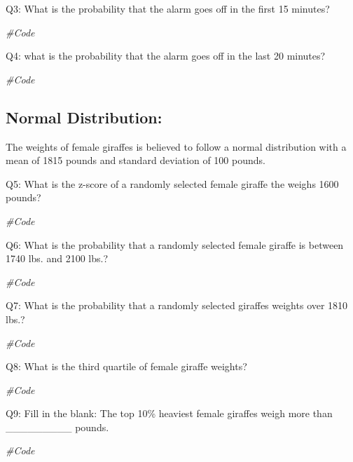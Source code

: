 \documentclass[]{article}
\newenvironment{Shaded}{\begin{snugshade}}{\end{snugshade}}
\newcommand{\CommentTok}[1]{\textcolor[rgb]{0.56,0.35,0.01}{\textit{#1}}}
\begin{document}
Q3: What is the probability that the alarm goes off in the first 15
minutes?

\begin{Shaded}
\begin{Highlighting}[]
\CommentTok{#Code}
\end{Highlighting}
\end{Shaded}

Q4: what is the probability that the alarm goes off in the last 20
minutes?

\begin{Shaded}
\begin{Highlighting}[]
\CommentTok{#Code}
\end{Highlighting}
\end{Shaded}

\newpage

\hypertarget{normal-distribution}{%
\subsection{Normal Distribution:}\label{normal-distribution}}

The weights of female giraffes is believed to follow a normal
distribution with a mean of 1815 pounds and standard deviation of 100
pounds.

Q5: What is the z-score of a randomly selected female giraffe the weighs
1600 pounds?

\begin{Shaded}
\begin{Highlighting}[]
\CommentTok{#Code}
\end{Highlighting}
\end{Shaded}

Q6: What is the probability that a randomly selected female giraffe is
between 1740 lbs. and 2100 lbs.?

\begin{Shaded}
\begin{Highlighting}[]
\CommentTok{#Code}
\end{Highlighting}
\end{Shaded}

Q7: What is the probability that a randomly selected giraffes weights
over 1810 lbs.?

\begin{Shaded}
\begin{Highlighting}[]
\CommentTok{#Code}
\end{Highlighting}
\end{Shaded}

Q8: What is the third quartile of female giraffe weights?

\begin{Shaded}
\begin{Highlighting}[]
\CommentTok{#Code}
\end{Highlighting}
\end{Shaded}

Q9: Fill in the blank: The top 10\% heaviest female giraffes weigh more
than \_\_\_\_\_\_\_\_\_ pounds.

\begin{Shaded}
\begin{Highlighting}[]
\CommentTok{#Code}
\end{Highlighting}
\end{Shaded}
\end{document}
